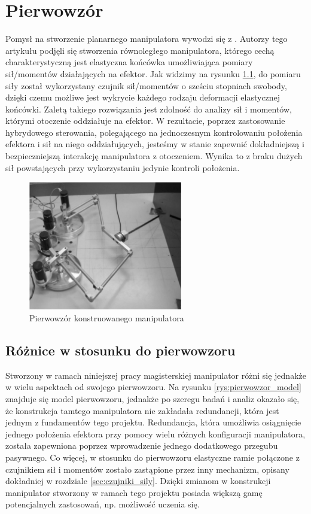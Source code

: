 \documentclass[printmode]{mgr}
\begin{document}
\chapter{Pierwowzór} \label{ch:pierwowzor}
Pomysł na stworzenie planarnego manipulatora wywodzi się z \cite{wzor}. 
Autorzy tego artykułu podjęli się stworzenia równoległego manipulatora, którego cechą charakterystyczną
jest elastyczna końcówka umożliwiająca pomiary sił/momentów działających na efektor. 
Jak widzimy na rysunku \ref{rys:pierwowzor_zdjecie}, do pomiaru siły został wykorzystany czujnik sił/momentów
o sześciu stopniach swobody, dzięki czemu możliwe jest wykrycie każdego rodzaju deformacji elastycznej
końcówki. Zaletą takiego rozwiązania jest zdolność do analizy sił i momentów, którymi otoczenie
oddziałuje na efektor. W rezultacie, poprzez zastosowanie hybrydowego sterowania, polegającego
na jednoczesnym kontrolowaniu położenia efektora i sił na niego oddziałujących, jesteśmy w stanie zapewnić
dokładniejszą i bezpieczniejszą interakcję manipulatora z otoczeniem. Wynika to z braku dużych sił powstających
przy wykorzystaniu jedynie kontroli położenia.
\begin{figure}[tp]
\centering
  \includegraphics[width=0.6\textwidth]{grafika/pierwowzor_zdjecie}
  \caption{Pierwowzór konstruowanego manipulatora}
  \label{rys:pierwowzor_zdjecie}  
\end{figure}

\section{Różnice w stosunku do pierwowzoru}\label{sec:roznice_do_pierwowzoru}
Stworzony w ramach niniejszej pracy magisterskiej manipulator różni się jednakże w wielu aspektach od
swojego pierwowzoru. Na rysunku \ref{rys:pierwowzor_model} znajduje się model pierwowzoru, jednakże po szeregu badań i analiz 
okazało się, że konstrukcja tamtego manipulatora nie zakładała redundancji, która jest jednym z
fundamentów tego projektu. Redundancja, która umożliwia osiągnięcie jednego położenia efektora przy pomocy
wielu różnych konfiguracji manipulatora, została zapewniona poprzez wprowadzenie jednego dodatkowego przegubu
pasywnego. Co więcej, w stosunku do pierwowzoru elastyczne ramie połączone z czujnikiem sił i momentów
zostało zastąpione przez inny mechanizm, opisany dokładniej w rozdziale \ref{sec:czujniki_sily}.
Dzięki zmianom w konstrukcji manipulator stworzony w ramach tego projektu posiada większą gamę
potencjalnych zastosowań, np. możliwość uczenia się. 
\end{document}
